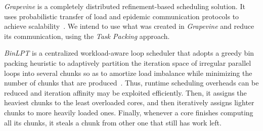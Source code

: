 \textit{Grapevine} is a completely distributed refinement-based scheduling solution.
It uses probabilistic transfer of load and epidemic communication protocols to achieve scalability~\cite{grapevine}.
We intend to use what was created in \textit{Grapevine} and reduce its communication, using the \textit{Task Packing} approach.

\textit{BinLPT} is a centralized workload-aware loop scheduler that adopts a greedy bin packing heuristic to adaptively partition the iteration space of irregular parallel loops into several chunks so as to amortize load imbalance while minimizing the number of chunks that are produced~\cite{Castro-Penna-WSCAD:2017}. Thus, runtime scheduling overheads can be reduced and iteration affinity may be exploited efficiently. Then, it assigns the heaviest chunks to the least overloaded cores, and then iteratively assigns lighter chunks to more heavily loaded ones. Finally, whenever a core finishes computing all its chunks, it steals a chunk from other one that still has work left.


